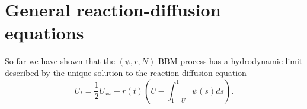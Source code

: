 \documentclass{article}
\newcommand{\is}{\mathbbm{1}}
\begin{document}


\section{General reaction-diffusion equations} \label{generalFKPPSection}

So far we have shown that the $(\psi,r,N)$-BBM process has a hydrodynamic limit described by the unique solution to the reaction-diffusion equation
$$U_t = \frac12 U_{xx} + r(t)\left( U-\int_{1-U}^1 \psi(s)ds\right).$$
\end{document}
